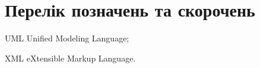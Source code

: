 \section*{Перелік позначень та скорочень}

\begin{abbrDescription}
\item[UML] Unified Modeling Language;
\item[XML] eXtensible Markup Language.
\end{abbrDescription}
